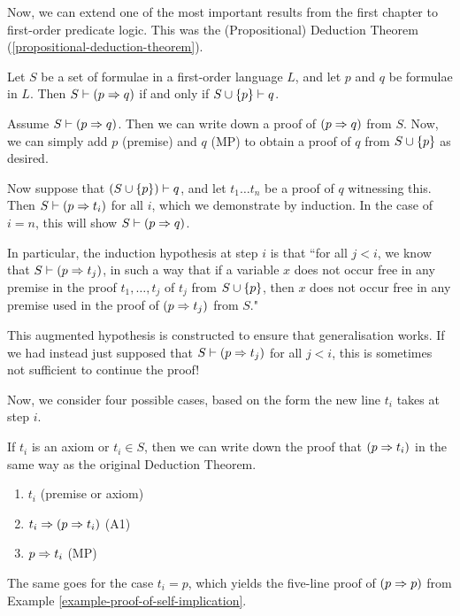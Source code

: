 \documentclass{article}
\begin{document}
Now, we can extend one of the most important results from the first chapter to first-order predicate logic. This was the (Propositional) Deduction Theorem (\ref{propositional-deduction-theorem}).

\begin{theorem}
	\label{first-order-deduction-theorem}
    Let $S$ be a set of formulae in a first-order language $L$, and let $p$ and $q$ be formulae in $L$.
    Then $S \vdash (p \Rightarrow q)$ if and only if $S \cup \left\lbrace p \right\rbrace \vdash q$.
\end{theorem}


\begin{prf}
    Assume $S \vdash (p \Rightarrow q)$. Then we can write down a proof of $(p \Rightarrow q)$ from $S$. Now, we can simply add $p$ (premise) and $q$ (MP) to obtain a proof of $q$ from $S \cup \left\lbrace p \right\rbrace$ as desired.
    
    Now suppose that $(S \cup \left\lbrace p \right\rbrace) \vdash q$, and let $t_1 \dots t_n$ be a proof of $q$ witnessing this. Then $S \vdash (p \Rightarrow t_i)$ for all $i$, which we demonstrate by induction. In the case of $i = n$, this will show $S \vdash (p \Rightarrow q)$.
    
    In particular, the induction hypothesis at step $i$ is that
    ``for all $j < i$, we know that $S \vdash (p \Rightarrow t_j)$,
    in such a way that if a variable $x$ does not occur free in any premise in the proof $t_1, \dots, t_j$ of $t_j$ from $S \cup \left\lbrace p \right\rbrace$,
    then $x$ does not occur free in any premise used in the proof of $(p \Rightarrow t_j)$ from $S$."
    
    This augmented hypothesis is constructed to ensure that generalisation works. If we had instead just  supposed that $S \vdash (p \Rightarrow t_j)$ for all $j < i$, this is sometimes not sufficient to continue the proof!
    
    Now, we consider four possible cases, based on the form the new line $t_i$ takes at step $i$.
    
    If $t_i$ is an axiom or $t_i \in S$, then we can write down the proof that $(p \Rightarrow t_i)$ in the same way as the original Deduction Theorem.
    \begin{enumerate}
    	\item $t_i$ \hfill (premise or axiom)
    	\item $t_i \Rightarrow (p \Rightarrow t_i)$ \hfill (A1)
    	\item $p \Rightarrow t_i$ \hfill (MP)
	\end{enumerate}
    The same goes for the case $t_i = p$, which yields the five-line proof of $(p \Rightarrow p)$ from Example \ref{example-proof-of-self-implication}.
    

\end{prf}
\end{document}
